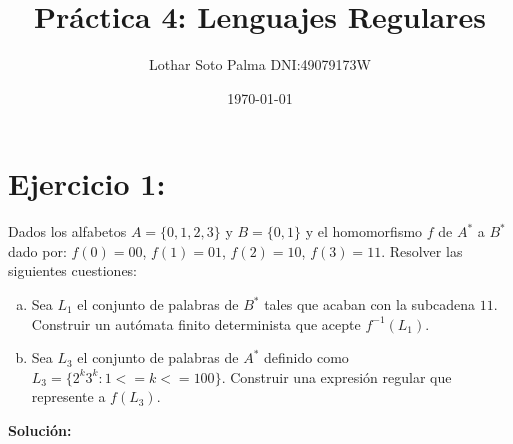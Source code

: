 \documentclass{article}
\title{Práctica 4: Lenguajes Regulares}
\author{Lothar Soto Palma DNI:49079173W}
\date{\today}
\begin{document}
\maketitle

\section*{Ejercicio 1:}
Dados los alfabetos $A=\{0,1,2,3\}$ y $B=\{0,1\}$ y el homomorfismo $f$ de $A^*$ a $B^*$ dado por: $f(0)=00$, $f(1)=01$, $f(2)=10$, $f(3)=11$. Resolver las siguientes cuestiones:
\begin{enumerate}[a)]
\item Sea $L_1$ el conjunto de palabras de $B^*$ tales que acaban con la subcadena $11$. Construir un autómata finito determinista que acepte $f^{-1}(L_1)$.
\item Sea $L_3$ el conjunto de palabras de $A^*$ definido como $L_3= \{2^k3^k:1<=k<=100\}$. Construir una expresión regular que represente a $f(L_3)$.
\end{enumerate}
\textbf{Solución:}
\end{document}

